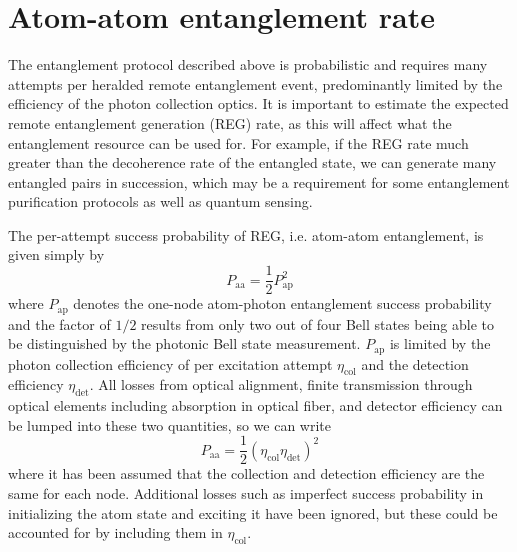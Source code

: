 \section{Atom-atom entanglement rate}\label{sec:entanglementrate}

The entanglement protocol described above is probabilistic and requires many attempts per heralded remote entanglement event, predominantly limited by the efficiency of the photon collection optics. It is important to estimate the expected remote entanglement generation (REG) rate, as this will affect what the entanglement resource can be used for. For example, if the REG rate much greater than the decoherence rate of the entangled state, we can generate many entangled pairs in succession, which may be a requirement for some entanglement purification protocols as well as quantum sensing.

The per-attempt success probability of REG, i.e. atom-atom entanglement, is given simply by
\begin{equation}
    P_{\text{aa}} = \frac{1}{2}P_{\text{ap}}^2
\end{equation}
where $P_{\text{ap}}$ denotes the one-node atom-photon entanglement success probability and the factor of $1/2$ results from only two out of four Bell states being able to be distinguished by the photonic Bell state measurement. $P_{\text{ap}}$ is limited by the photon collection efficiency of per excitation attempt $\eta_{\text{col}}$ and the detection efficiency $\eta_{\text{det}}$. All losses from optical alignment, finite transmission through optical elements including absorption in optical fiber, and detector efficiency can be lumped into these two quantities, so we can write 
\begin{equation}
    P_{\text{aa}} = \frac{1}{2}\left(\eta_{\text{col}}\eta_{\text{det}}\right)^2
\end{equation}
where it has been assumed that the collection and detection efficiency are the same for each node. Additional losses such as imperfect success probability in initializing the atom state and exciting it have been ignored, but these could be accounted for by including them in $\eta_{\text{col}}$.

